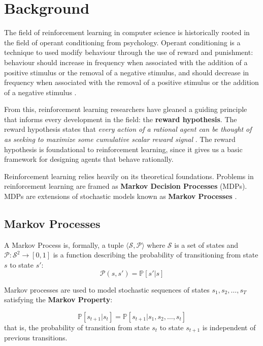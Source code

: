 \documentclass[journal, onecolumn, 12pt, draftclsnofoot]{IEEEtran}
\newcommand{\kword}[1]{\textbf{#1}}
\newcommand{\mc}[1]{\mathcal{#1}}
\begin{document}
	\section{Background}
	\label{sec:background}
	\par The field of reinforcement learning in computer science is historically rooted in the field of operant conditioning from psychology. Operant conditioning is a technique to used modify behaviour through the use of reward and punishment: behaviour should increase in frequency when associated with the addition of a positive stimulus or the removal of a negative stimulus, and should decrease in frequency when associated with the removal of a positive stimulus or the addition of a negative stimulus \cite{operant_conditioning}.
	\par From this, reinforcement learning researchers have gleaned a guiding principle that informs every development in the field: the \kword{reward hypothesis}. The reward hypothesis states that \textit{every action of a rational agent can be thought of as seeking to maximize some cumulative scalar reward signal} \cite{reward_hypothesis}. The reward hypothesis is foundational to reinforcement learning, since it gives us a basic framework for designing agents that behave rationally.
	\par Reinforcement learning relies heavily on its theoretical foundations. Problems in reinforcement learning are framed as \kword{Markov Decision Processes} (MDPs). MDPs are extensions of stochastic models known as \kword{Markov Processes} \cite{rl}.

		\subsection{Markov Processes}
		\par A Markov Process is, formally, a tuple $\langle \mc{S}, \mc{P} \rangle$ where $\mc{S}$ is a set of states and $\mc{P} : \mc{S}^2 \to [0, 1]$ is a function describing the probability of transitioning from state $s$ to state $s'$:
		\begin{equation}
			\label{eqn:state_transition_probability}
			\mc{P}(s,s') = \mathbb{P} \left[s' \big\vert s \right]
		\end{equation}

		 \par Markov processes are used to model stochastic sequences of states $s_1, s_2, \dots, s_T$ satisfying the \kword{Markov Property}:

	\begin{equation}
		\label{eqn:markov_property}
		\mathbb{P}\left[ s_{t+1} \big\vert s_t \right] = \mathbb{P}\left[ {s_{t+1} \big\vert s_1, s_2, \dots, s_t} \right]
	\end{equation}
	that is, the probability of transition from state $s_t$ to state $s_{t+1}$ is independent of previous transitions.
\end{document}

